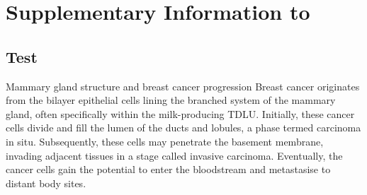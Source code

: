 \chapter{Supplementary Information to \texorpdfstring{}{}}

\section{Test}

    {Mammary gland structure and breast cancer progression}
    {Breast cancer originates from the bilayer epithelial cells lining the branched system of the mammary gland, often specifically within the milk-producing \acf{TDLU}. Initially, these cancer cells divide and fill the lumen of the ducts and lobules, a phase termed carcinoma in situ. Subsequently, these cells may penetrate the basement membrane, invading adjacent tissues in a stage called invasive carcinoma. Eventually, the cancer cells gain the potential to enter the bloodstream and metastasise to distant body sites.}
